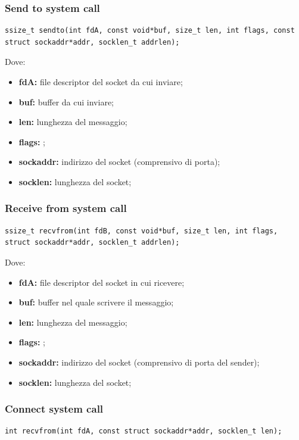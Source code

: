 \subsubsection{Send to system call}
\begin{lstlisting}[caption=Esempio di syscall sendto]
ssize_t sendto(int fdA, const void*buf, size_t len, int flags, const struct sockaddr*addr, socklen_t addrlen);
\end{lstlisting}

Dove:
\begin{itemize}
  \item \textbf{fdA:} file descriptor del socket da cui inviare;
  \item \textbf{buf:} buffer da cui inviare;
  \item \textbf{len:} lunghezza del messaggio;
  \item \textbf{flags:} ;
  \item \textbf{sockaddr:} indirizzo del socket (comprensivo di porta);
  \item \textbf{socklen:} lunghezza del socket;
\end{itemize}

\subsubsection{Receive from system call}
\begin{lstlisting}[caption=Esempio di syscall receivefrom]
ssize_t recvfrom(int fdB, const void*buf, size_t len, int flags, struct sockaddr*addr, socklen_t addrlen);
\end{lstlisting}

Dove:
\begin{itemize}
  \item \textbf{fdA:} file descriptor del socket in cui ricevere;
  \item \textbf{buf:} buffer nel quale scrivere il messaggio;
  \item \textbf{len:} lunghezza del messaggio;
  \item \textbf{flags:} ;
  \item \textbf{sockaddr:} indirizzo del socket (comprensivo di porta del
    sender);
  \item \textbf{socklen:} lunghezza del socket;
\end{itemize}

\subsubsection{Connect system call}
\begin{lstlisting}[caption=Esempio di syscall connect]
int recvfrom(int fdA, const struct sockaddr*addr, socklen_t len);
\end{lstlisting}


